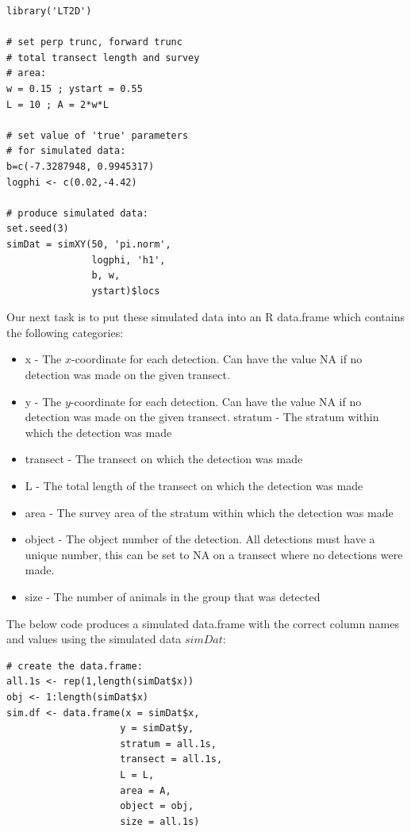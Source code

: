 \documentclass[11pt]{article}
\begin{document}
\begin{multicols}{2}
\begingroup
\small
\begin{lstlisting}
library('LT2D')

# set perp trunc, forward trunc
# total transect length and survey
# area:
w = 0.15 ; ystart = 0.55
L = 10 ; A = 2*w*L

# set value of 'true' parameters
# for simulated data:
b=c(-7.3287948, 0.9945317)
logphi <- c(0.02,-4.42)

# produce simulated data:
set.seed(3)
simDat = simXY(50, 'pi.norm',
               logphi, 'h1', 
               b, w, 
               ystart)$locs
\end{lstlisting}
\endgroup

Our next task is to put these simulated data into an R data.frame which contains the following categories:

\begin{itemize}
\item x - The $x$-coordinate for each detection. Can have the value NA if no detection was made on the given transect.
\item y - The $y$-coordinate for each detection. Can have the value NA if no detection was made on the given transect.
stratum - The stratum within which the detection was made
\item transect - The transect on which the detection was made
\item L - The total length of the transect on which the detection was made
\item area - The survey area of the stratum within which the detection was made
\item object - The object number of the detection. All detections must have a unique number, this can be set to NA on a transect where no detections were made.
\item size - The number of animals in the group that was detected
\end{itemize}

The below code produces a simulated data.frame with the correct column names and values using the simulated data $simDat$:

\begingroup
\small
\begin{lstlisting}
# create the data.frame:
all.1s <- rep(1,length(simDat$x))
obj <- 1:length(simDat$x)
sim.df <- data.frame(x = simDat$x,
                    y = simDat$y,
                    stratum = all.1s,
                    transect = all.1s,
                    L = L,
                    area = A,
                    object = obj,
                    size = all.1s)
\end{lstlisting}
\endgroup


\end{multicols}
\end{document}

